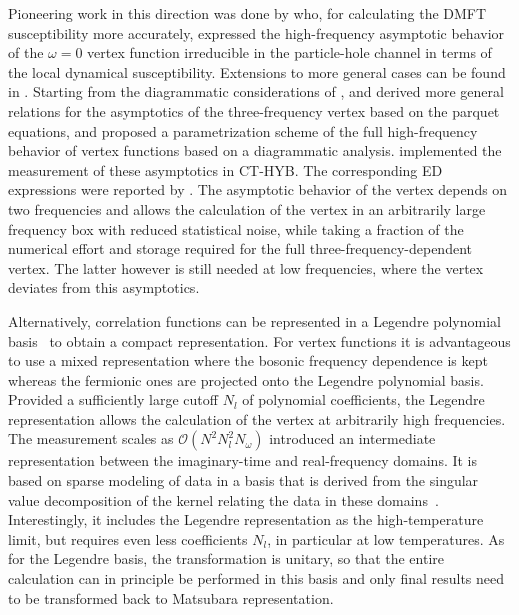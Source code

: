 \documentclass[rmp,aps,reprint,amsmath,amssymb,superscriptaddress,showpacs,nofootinbib]{revtex4-1}
\begin{document}
Pioneering work in this direction was done by  who, for calculating the DMFT susceptibility more accurately, expressed  the high-frequency asymptotic behavior of the $\omega=0$ vertex function irreducible in the particle-hole channel in terms of the local dynamical susceptibility. Extensions to more general cases can be found in . Starting from the diagrammatic considerations of ,  and  derived more general relations for the asymptotics of the three-frequency  vertex based on the  parquet equations, and proposed a parametrization scheme of the full high-frequency behavior  of vertex functions based on a diagrammatic analysis.  implemented the measurement of these asymptotics in CT-HYB. The corresponding ED expressions were reported by . The asymptotic behavior of the vertex depends on two frequencies and allows the calculation of the vertex in an  arbitrarily large frequency box with reduced  statistical noise, while taking a fraction of the numerical effort and storage required for the full three-frequency-dependent vertex. The latter however is still needed at low frequencies, where the vertex deviates from this asymptotics.

Alternatively, correlation functions can be represented in a Legendre polynomial basis~\cite{Boehnke2011} to obtain a compact representation. For vertex functions it is advantageous to use a mixed representation where the bosonic frequency dependence is kept whereas the fermionic ones are projected onto the Legendre polynomial basis. Provided a sufficiently large cutoff $N_{l}$ of polynomial coefficients, the Legendre representation allows the calculation of the vertex at arbitrarily high frequencies. The measurement scales as $\mathcal{O}(N^{2}N_{l}^{2}N_{\omega})$  introduced an intermediate representation between the imaginary-time and real-frequency domains. It is based on sparse modeling of data in a basis that is derived from the singular value decomposition of the kernel relating the data in these domains~\cite{Otsuki2017}. Interestingly, it includes the Legendre representation as the high-temperature limit, but requires even less coefficients $N_{l}$, in particular at low temperatures. As for the Legendre basis, the transformation is unitary, so that the entire calculation can in principle be performed in this basis and only final results need to be transformed back to Matsubara representation.
\end{document}
